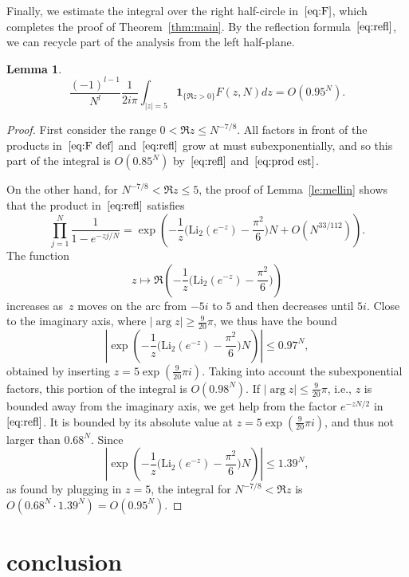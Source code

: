 \documentclass[a4paper]{amsart}
\newtheorem{lemma}[theorem]{Lemma}
\begin{document}
Finally, we estimate the integral over the right half-circle in~$\eqref{eq:F}$,
which completes the proof of Theorem~\ref{thm:main}.
By the reflection formula~$\eqref{eq:refl}$, we can recycle part of the
analysis from the left half-plane.

\begin{lemma}
  \[
   \frac{(-1)^{l-1}}{N^l} \frac{1}{2i\pi} \int_{|z|=5}
     \mathbf{1}_{\{\Re z>0\}} F(z,N) dz = O(0.95^N).
  \]
\end{lemma}
\begin{proof}
  First consider the range $0< \Re z \leq N^{-7/8}$. All factors
  in front of the products in~$\eqref{eq:F def}$ and~$\eqref{eq:refl}$
  grow at must subexponentially, and so this part of the integral
  is $O(0.85^N)$ by~$\eqref{eq:refl}$ and~$\eqref{eq:prod est}$.
  
  On the other hand, for $N^{-7/8}< \Re z \leq 5$, the proof
  of Lemma~\ref{le:mellin} shows that the product in~$\eqref{eq:refl}$
  satisfies
  \[
    \prod_{j=1}^N \frac{1}{1-e^{-zj/N}} = \exp\left(
    -\frac{1}{z}\Big( \mathrm{Li}_2(e^{-z}) - \frac{\pi^2}{6}\Big)N
    +O(N^{33/112}) \right).
  \]
  The function
  \[
    z \mapsto \Re\left(-\frac{1}{z}
      \Big( \mathrm{Li}_2(e^{-z}) - \frac{\pi^2}{6}\Big) \right)
  \]
  increases as~$z$ moves on the arc from $-5i$ to $5$ and then
  decreases until $5i$. Close to the imaginary axis, where
  $|\arg z|\geq \tfrac{9}{20}\pi$, we thus
  have the bound
  \[
    \left|\exp\left(
    -\frac{1}{z}\Big( \mathrm{Li}_2(e^{-z}) - \frac{\pi^2}{6}\Big)N \right) \right|
    \leq 0.97^N,
  \]
  obtained by inserting $z=5\exp(\tfrac{9}{20}\pi i)$. Taking into account
  the subexponential factors, this portion of the integral
  is $O(0.98^N)$. If $|\arg z|\leq \tfrac{9}{20}\pi$, i.e., $z$ is bounded away
  from the imaginary axis, we get help from the factor $e^{-zN/2}$
  in~$\eqref{eq:refl}$. It is bounded by its absolute value
  at $z=5\exp(\tfrac{9}{20}\pi i)$, and thus not larger than $0.68^N$.
  Since
  \[
    \left|\exp\left(
    -\frac{1}{z}\Big( \mathrm{Li}_2(e^{-z}) - \frac{\pi^2}{6}\Big)N \right) \right|
    \leq 1.39^N,
  \]
  as found by plugging in $z=5$, the integral for $N^{-7/8}< \Re z$
  is $O(0.68^N \cdot 1.39^N)=O(0.95^N)$.
\end{proof}

\section{conclusion}
\end{document}
